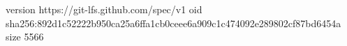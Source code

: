 version https://git-lfs.github.com/spec/v1
oid sha256:892d1c52222b950ca25a6ffa1cb0ceee6a909c1c474092e289802cf87bd6454a
size 5566
